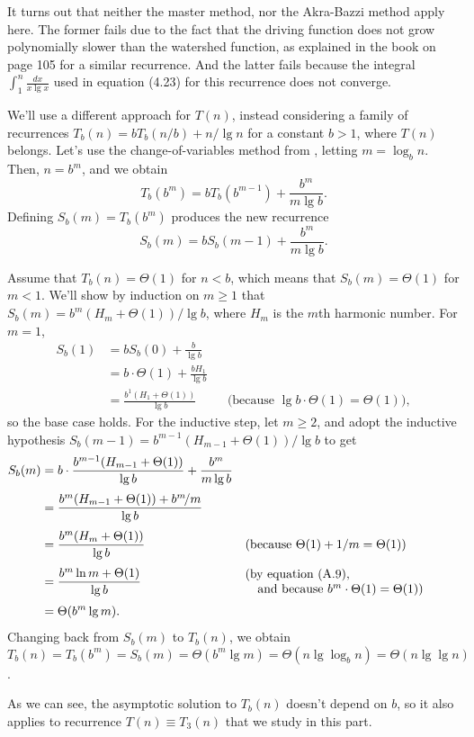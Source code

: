 It turns out that neither the master method, nor the Akra-Bazzi method apply here.
The former fails due to the fact that the driving function does not grow polynomially slower than the watershed function, as explained in the book on page 105 for a similar recurrence.
And the latter fails because the integral $\int_1^n\frac{dx}{x\lg x}$ used in equation (4.23) for this recurrence does not converge.

We'll use a different approach for $T(n)$, instead considering a family of recurrences $T_b(n)=bT_b(n/b)+n/\!\lg n$ for a constant $b>1$, where $T(n)$ belongs.
Let's use the change-of-variables method from , letting $m=\log_bn$.
Then, $n=b^m$, and we obtain
\[
	T_b(b^m) = bT_b(b^{m-1})+\frac{b^m}{m\lg b}.
\]
Defining $S_b(m)=T_b(b^m)$ produces the new recurrence
\[
	S_b(m) = bS_b(m-1)+\frac{b^m}{m\lg b}.
\]

Assume that $T_b(n)=\Theta(1)$ for $n<b$, which means that $S_b(m)=\Theta(1)$ for $m<1$.
We'll show by induction on $m\ge1$ that $S_b(m)=b^m(H_m+\Theta(1))/\lg b$, where $H_m$ is the $m$th harmonic number.
For $m=1$,
\begin{align*}
    S_b(1) &= bS_b(0)+\frac{b}{\lg b} \\[1mm]
	&= b\cdot\Theta(1)+\frac{bH_1}{\lg b} \\[1mm]
	&= \frac{b^1(H_1+\Theta(1))}{\lg b} && \text{(because $\lg b\cdot\Theta(1)=\Theta(1)$)},
\end{align*}
so the base case holds.
For the inductive step, let $m\ge2$, and adopt the inductive hypothesis $S_b(m-1)=b^{m-1}(H_{m-1}+\Theta(1))/\lg b$ to get
\begin{align*}
    S_b(m) &= b\cdot\frac{b^{m-1}(H_{m-1}+\Theta(1))}{\lg b}+\frac{b^m}{m\lg b} \\[1mm]
	&= \frac{b^m(H_{m-1}+\Theta(1))+b^m\!/m}{\lg b} \\[1mm]
	&= \frac{b^m(H_m+\Theta(1))}{\lg b} && \text{(because $\Theta(1)+1/m=\Theta(1)$)} \\[1mm]
	&= \frac{b^m\ln m+\Theta(1)}{\lg b} && \begin{minipage}{2.25in}(by equation (A.9),\\\null\quad and because $b^m\cdot\Theta(1)=\Theta(1)$)\end{minipage} \\[1mm]
	&= \Theta(b^m\lg m).
\end{align*}
Changing back from $S_b(m)$ to $T_b(n)$, we obtain $T_b(n)=T_b(b^m)=S_b(m)=\Theta(b^m\lg m)=\Theta(n\lg\log_b n)=\Theta(n\lg\lg n)$.

As we can see, the asymptotic solution to $T_b(n)$ doesn't depend on $b$, so it also applies to recurrence $T(n)\equiv T_3(n)$ that we study in this part.
